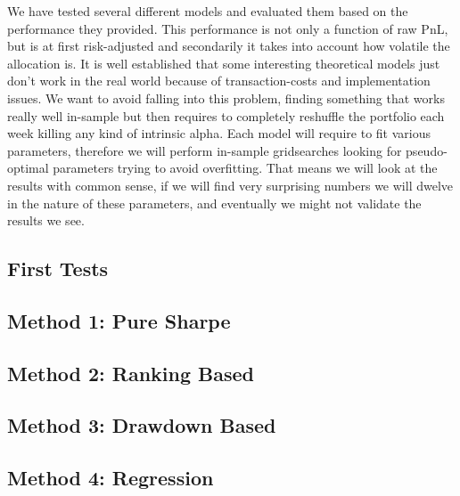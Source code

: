 \documentclass[12pt]{article} %
\numberwithin{equation}{subsection}
\begin{document}
We have tested several different models and evaluated them based on the performance they provided. This performance is not only a function of raw PnL, but is at first risk-adjusted and secondarily it takes into account how volatile the allocation is. It is well established that some interesting theoretical models just don't work in the real world because of transaction-costs and implementation issues. We want to avoid falling into this problem, finding something that works really well in-sample but then requires to completely reshuffle the portfolio each week killing any kind of intrinsic alpha.
Each model will require to fit various parameters, therefore we will perform in-sample gridsearches looking for pseudo-optimal parameters trying to avoid overfitting. That means we will look at the results with common sense, if we will find very surprising numbers we will dwelve in the nature of these parameters, and eventually we might not validate the results we see.\\


\subsection{First Tests}



\subsection{Method 1: Pure Sharpe}




\subsection{Method 2: Ranking Based}





\subsection{Method 3: Drawdown Based}



\subsection{Method 4: Regression}


\end{document}
